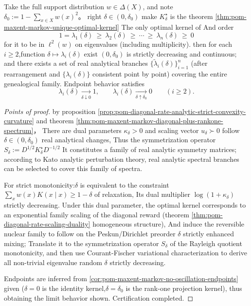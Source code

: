 \begin{theorem}\label{thm:pom-maxent-markov-spectrum-monotone-in-delta}
Take the full support distribution \(w\in\Delta(X)\), and note \(\delta_0:=1-\sum_{x\in X}w(x)^2\)。
right \(\delta\in(0,\delta_0)\) make \(K^\star_\delta\) is the theorem \ref{thm:pom-maxent-markov-unique-optimal-kernel} The only optimal kernel of
And order
\[
1=\lambda_1(\delta)\ \ge\ \lambda_2(\delta)\ \ge\ \cdots\ \ge\ \lambda_n(\delta)\ \ge\ 0
\]
for it to be in \(\ell^2(w)\) on eigenvalues ​​(including multiplicity).
then for each \(i\ge 2\),function \(\delta\mapsto \lambda_i(\delta)\) exist \((0,\delta_0)\) is strictly decreasing and continuous;
and there exists a set of real analytical branches \(\{\widetilde\lambda_i(\delta)\}_{i=1}^n\) (after rearrangement and \(\{\lambda_i(\delta)\}\) consistent point by point) covering the entire genealogical family.
Endpoint behavior satisfies
\[
\lambda_i(\delta)\xrightarrow[\delta\downarrow 0]{}1,
\qquad
\lambda_i(\delta)\xrightarrow[\delta\uparrow \delta_0]{}0
\qquad(i\ge 2).
\]
\end{theorem}
\begin{proof}[Points of proof]
by proposition \ref{prop:pom-diagonal-rate-analytic-strict-convexity-curvature} and theorem \ref{thm:pom-maxent-markov-diagonal-plus-rankone-spectrum}，
There are dual parameters \(\kappa_\delta>0\) and scaling vector \(u_\delta\succ0\) follow \(\delta\in(0,\delta_0)\) real analytical changes,
Thus the symmetrization operator
\(
S_\delta:=D^{1/2}K^\star_\delta D^{-1/2}
\)
It constitutes a family of real analytic symmetry matrices; according to Kato analytic perturbation theory, real analytic spectral branches can be selected to cover this family of spectra.
\par
For strict monotonicity:\(\delta\) is equivalent to the constraint \(\sum_x w(x)K(x\mid x)\ge 1-\delta\) of relaxation,
Its dual multiplier \(\log(1+\kappa_\delta)\) strictly decreasing.
Under this dual parameter, the optimal kernel corresponds to an exponential family scaling of the diagonal reward (theorem \ref{thm:pom-diagonal-rate-scaling-duality} homogeneous structure),
And induce the reversible nuclear family to follow on the Peskun/Dirichlet preorder \(\delta\) strictly enhanced mixing;
Translate it to the symmetrization operator \(S_\delta\) of the Rayleigh quotient monotonicity, and then use Courant-Fischer variational characterization to derive all non-trivial eigenvalue random \(\delta\) strictly decreasing.
\par
Endpoints are inferred from \ref{cor:pom-maxent-markov-no-oscillation-endpoints} given (\(\delta=0\) is the identity kernel,\(\delta=\delta_0\) is the rank-one projection kernel), thus obtaining the limit behavior shown. Certification completed.
\end{proof}

